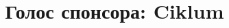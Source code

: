 \documentclass[10pt, a5paper]{article}
\begin{document}
\title{Голос спонсора: Ciklum}
\date{}
\maketitle



\end{document}
